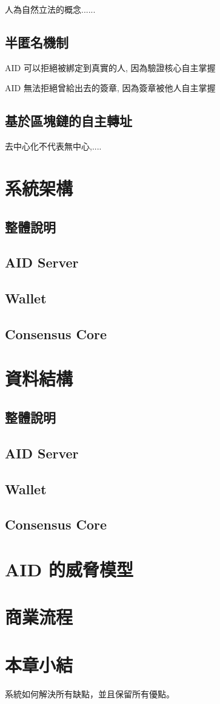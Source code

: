 人為自然立法的概念......

\subsection{半匿名機制}

AID 可以拒絕被綁定到真實的人, 因為驗證核心自主掌握

AID 無法拒絕曾給出去的簽章, 因為簽章被他人自主掌握

\subsection{基於區塊鏈的自主轉址}

去中心化不代表無中心,....

\section{系統架構}
\subsection{整體說明}
\subsection{AID Server}
\subsection{Wallet}
\subsection{Consensus Core}

\section{資料結構}
\subsection{整體說明}
\subsection{AID Server}
\subsection{Wallet}
\subsection{Consensus Core}

\section{AID 的威脅模型}

\section{商業流程}

\section{本章小結}

系統如何解決所有缺點，並且保留所有優點。